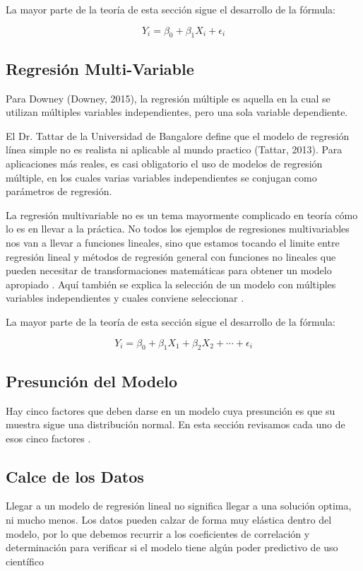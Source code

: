 \documentclass[letterpaper, spanish, 11pt]{report}
\begin{document}
La mayor parte de la teoría de esta sección sigue el desarrollo de la fórmula:

\[Y_{i} = \beta_{0} + \beta_{1}X_{i} + \epsilon_{i}\]

\subsection{Regresión Multi-Variable}
Para Downey (Downey, 2015), la regresión múltiple es aquella en la cual se utilizan múltiples variables independientes, pero una sola variable dependiente. 

El Dr. Tattar de la Universidad de Bangalore define que el modelo de regresión línea simple no es realista ni aplicable al mundo practico (Tattar, 2013). Para aplicaciones más reales, es casi obligatorio el uso de modelos de regresión múltiple, en los cuales varias variables independientes se conjugan como parámetros de regresión. 

La regresión multivariable no es un tema mayormente complicado en teoría cómo lo es en llevar a la práctica. No todos los ejemplos de regresiones multivariables nos van a llevar a funciones lineales, sino que estamos tocando el limite entre regresión lineal y métodos de regresión general con funciones no lineales que pueden necesitar de transformaciones matemáticas para obtener un modelo apropiado \cite{daroczi}. Aquí también se explica la selección de un modelo con múltiples variables independientes y cuales conviene seleccionar \cite{viswanathan}.

La mayor parte de la teoría de esta sección sigue el desarrollo de la fórmula:

\[Y_{i} = \beta_{0} + \beta_{1}X_{1} + \beta_{2}X_{2} + \cdots + \epsilon_{i}\]

\subsection{Presunción del Modelo}
Hay cinco factores que deben darse en un modelo cuya presunción es que su muestra sigue una distribución normal. En esta sección revisamos cada uno de esos cinco factores \cite{daroczi}.

\subsection{Calce de los Datos}
Llegar a un modelo de regresión lineal no significa llegar a una solución optima, ni mucho menos. Los datos pueden calzar de forma muy elástica dentro del modelo, por lo que debemos recurrir a los coeficientes de correlación y determinación para verificar si el modelo tiene algún poder predictivo de uso científico
\end{document}
